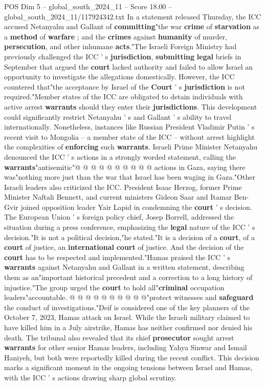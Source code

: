 \begin{textsample}{POS Dim 5 – global\_south\_2024\_11 – Score 18.00 – global\_south\_2024\_11/117924342.txt}  \label{ex:f5_pos_030}
In a statement released Thursday, the ICC accused Netanyahu and Gallant of \textbf{committing}"the war \textbf{crime} of \textbf{starvation} as a \textbf{method} of \textbf{warfare} ; and the \textbf{crimes} against \textbf{humanity} of murder, \textbf{persecution}, and other inhumane \textbf{acts}."The Israeli Foreign Ministry had previously challenged the ICC ' s \textbf{jurisdiction}, \textbf{submitting} \textbf{legal} briefs in September that argued the \textbf{court} lacked authority and failed to allow Israel an opportunity to investigate the allegations domestically.
However, the ICC countered that"the acceptance by Israel of the \textbf{Court} ' s \textbf{jurisdiction} is not required."Member states of the ICC are obligated to detain individuals with active arrest \textbf{warrants} should they enter their \textbf{jurisdictions}.
This development could significantly restrict Netanyahu ' s and Gallant ' s ability to travel internationally.
Nonetheless, instances like Russian President Vladimir Putin ' s recent visit to Mongolia -- a member state of the ICC -- without arrest highlight the complexities of \textbf{enforcing} such \textbf{warrants}.
Israeli Prime Minister Netanyahu denounced the ICC ' s actions in a strongly worded statement, calling the \textbf{warrants}"antisemitic"@ @ @ @ @ @ @ @ @ @ actions in Gaza, saying there was"nothing more just than the war that Israel has been waging in Gaza."Other Israeli leaders also criticized the ICC.
President Isaac Herzog, former Prime Minister Naftali Bennett, and current ministers Gideon Saar and Itamar Ben-Gvir joined opposition leader Yair Lapid in condemning the \textbf{court} ' s decision.
The European Union ' s foreign policy chief, Josep Borrell, addressed the situation during a press conference, emphasizing the \textbf{legal} nature of the ICC ' s decision."It is not a political decision,"he stated."It is a decision of a \textbf{court}, of a \textbf{court} of justice, an \textbf{international} \textbf{court} of justice.
And the decision of the \textbf{court} has to be respected and implemented."Hamas praised the ICC ' s \textbf{warrants} against Netanyahu and Gallant in a written statement, describing them as an"important historical precedent and a correction to a long history of injustice."The group urged the \textbf{court} to hold all"\textbf{criminal} occupation leaders"accountable. @ @ @ @ @ @ @ @ @ @"protect witnesses and \textbf{safeguard} the conduct of investigations."Deif is considered one of the key planners of the October 7, 2023, Hamas attack on Israel.
While the Israeli military claimed to have killed him in a July airstrike, Hamas has neither confirmed nor denied his death.
The tribunal also revealed that its chief \textbf{prosecutor} sought arrest \textbf{warrants} for other senior Hamas leaders, including Yahya Sinwar and Ismail Haniyeh, but both were reportedly killed during the recent conflict.
This decision marks a significant moment in the ongoing tensions between Israel and Hamas, with the ICC ' s actions drawing sharp global scrutiny.


\end{textsample}
